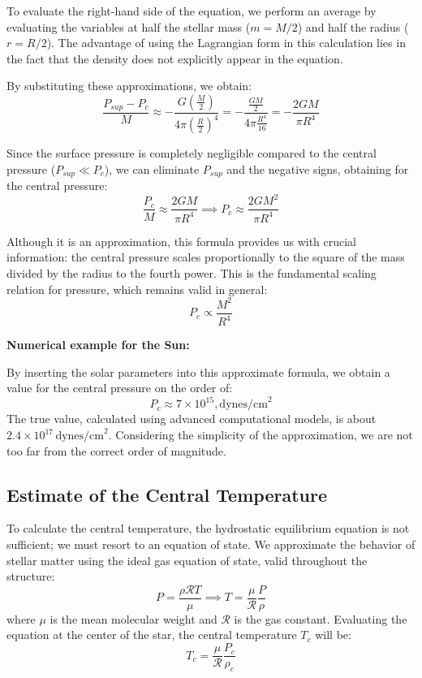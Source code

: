 To evaluate the right-hand side of the equation, we perform an average by evaluating the variables at half the stellar mass ($m = M/2$) and half the radius ($r = R/2$). The advantage of using the Lagrangian form in this calculation lies in the fact that the density does not explicitly appear in the equation.

By substituting these approximations, we obtain:
\begin{equation}
\frac{P_{sup} - P_c}{M} \approx - \frac{G \left(\frac{M}{2}\right)}{4\pi \left(\frac{R}{2}\right)^4} = - \frac{\frac{G M}{2}}{4\pi \frac{R^4}{16}} = - \frac{2 G M}{\pi R^4}
\end{equation}

Since the surface pressure is completely negligible compared to the central pressure ($P_{sup} \ll P_c$), we can eliminate $P_{sup}$ and the negative signs, obtaining for the central pressure:
\begin{equation}
\frac{P_c}{M} \approx \frac{2 G M}{\pi R^4} \implies P_c \approx \frac{2 G M^2}{\pi R^4}
\end{equation}

Although it is an approximation, this formula provides us with crucial information: the central pressure scales proportionally to the square of the mass divided by the radius to the fourth power. This is the fundamental scaling relation for pressure, which remains valid in general:
\begin{equation}
P_c \propto \frac{M^2}{R^4}
\end{equation}

\textbf{Numerical example for the Sun:}

By inserting the solar parameters into this approximate formula, we obtain a value for the central pressure on the order of:
\begin{equation}
P_c \approx 7 \times 10^{15} , \text{dynes/cm}^2
\end{equation}
The true value, calculated using advanced computational models, is about $2.4 \times 10^{17} \, \text{dynes/cm}^2$. Considering the simplicity of the approximation, we are not too far from the correct order of magnitude.

\subsection{Estimate of the Central Temperature}

To calculate the central temperature, the hydrostatic equilibrium equation is not sufficient; we must resort to an equation of state. We approximate the behavior of stellar matter using the ideal gas equation of state, valid throughout the structure:
\begin{equation}
P = \frac{\rho \mathcal{R} T}{\mu} \implies T = \frac{\mu}{\mathcal{R}} \frac{P}{\rho}
\end{equation}
where $\mu$ is the mean molecular weight and $\mathcal{R}$ is the gas constant.
Evaluating the equation at the center of the star, the central temperature $T_c$ will be:
\begin{equation}
T_c = \frac{\mu}{\mathcal{R}} \frac{P_c}{\rho_c}
\end{equation}

